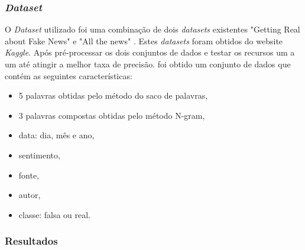 \subsubsection{\textit{Dataset}}

O \textit{Dataset} utilizado foi uma combinação de dois \textit{datasets} existentes  "Getting Real about
Fake News" \cite{fakenews2016} e "All the news" \cite{allthenews2017}. Estes \textit{datasets} foram obtidos do website \textit{Kaggle}. Após pré-processar os dois conjuntos de dados e testar os recursos um a um até atingir a melhor taxa de precisão. foi obtido um conjunto de dados que contém as seguintes características:

\begin{itemize}
    \item 5 palavras obtidas pelo método do saco de palavras,
    \item 3 palavras compostas obtidas pelo método N-gram,
    \item data: dia, mês e ano,
    \item sentimento,
    \item fonte,
    \item autor,
    \item classe: falsa ou real. \\
\end{itemize}

\subsubsection{Resultados}



